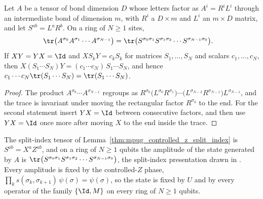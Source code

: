 \begin{lemma}
    \label{lem:mps_split_index_trace}
    \leanok
    Let $A$ be a tensor of bond dimension $D$ whose letters factor as
    $A^i=R^iL^i$ through an intermediate bond of dimension $m$, with $R^i$ a
    $D\times m$ and $L^i$ an $m\times D$ matrix, and let
    $S^{ab}=L^aR^b$. On a ring of $N\geq1$ sites,
    \begin{align}
        \tr\bigl(A^{\sigma_0}A^{\sigma_1}\cdots A^{\sigma_{N-1}}\bigr)
         & =\tr\bigl(S^{\sigma_0\sigma_1}S^{\sigma_1\sigma_2}\cdots
        S^{\sigma_{N-1}\sigma_0}\bigr).
        \label{eq:mps_split_index_trace}
    \end{align}
    If $XY=YX=\Id$ and $XS_kY=c_kS_k$ for matrices $S_1,\dots,S_N$ and scalars
    $c_1,\dots,c_N$, then $X(S_1\cdots S_N)Y=(c_1\cdots c_N)\,S_1\cdots S_N$,
    and hence $c_1\cdots c_N\tr(S_1\cdots S_N)=\tr(S_1\cdots S_N)$.
\end{lemma}

\begin{proof}\leanok
    The product $A^{\sigma_0}\cdots A^{\sigma_{N-1}}$ regroups as
    $R^{\sigma_0}\bigl(L^{\sigma_0}R^{\sigma_1}\bigr)\cdots
        \bigl(L^{\sigma_{N-2}}R^{\sigma_{N-1}}\bigr)L^{\sigma_{N-1}}$, and the
    trace is invariant under moving the rectangular factor $R^{\sigma_0}$ to
    the end. For the second statement insert $YX=\Id$ between consecutive
    factors, and then use $YX=\Id$ once more after moving $X$ to the end
    inside the trace.
\end{proof}

\begin{lemma}
    \label{lem:mpug_controlled_z_simps_trace}
    \leanok
    The split-index tensor of Lemma~\ref{thm:mpug_controlled_z_split_index} is
    $S^{ab}=X^aZ^{ab}$, and on a ring of $N\geq1$ qubits the amplitude of the
    state generated by $A$ is
    $\tr\bigl(S^{\sigma_0\sigma_1}S^{\sigma_1\sigma_2}\cdots
        S^{\sigma_{N-1}\sigma_0}\bigr)$, the split-index presentation drawn in
    \cite[lines~3970--4001]{FrancoRubio2025MPUGauging}. Every amplitude is
    fixed by the controlled-$Z$ phase,
    $\prod_ks(\sigma_k,\sigma_{k+1})\,\psi(\sigma)=\psi(\sigma)$, so the state
    is fixed by $U$ and by every operator of the family $\{\Id,M\}$ on every
    ring of $N\geq1$ qubits.
\end{lemma}

